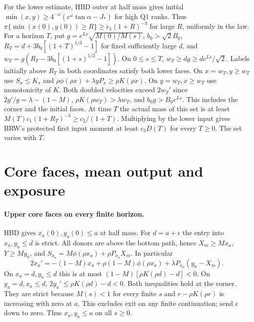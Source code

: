 \documentclass[11pt]{article}
\begin{document}
For the lower estimate, HBD outer at half mass gives initial
$\min(x,y)\ge4^{-\omega}(c^\omega\tan\alpha-J_*)$ for high Q1
ranks. Thus $\pi\{\min(x(0),y(0))\ge R\}\ge c_1(1+R)^{-3}$
for large $R$, uniformly in the law. For a horizon $T$, put
$g=e^{Ls}\sqrt{M(0)/M(s)}$, $b_0>\sqrt2 B_0$,
$R_T=d+3b_0[(1+T)^{1/3}-1]$ for fixed sufficiently large $d$,
and $w_T=g(R_T-3b_0[(1+s)^{1/3}-1])$. On $0\le s\le T$,
$w_T\ge dg\ge de^{Ls}/\sqrt2$. Labels initially above $R_T$
in both coordinates satisfy both lower faces. On $x=w_T,y\ge w_T$
use $S_x\le K_s$ and $\rho\phi(\rho x)+\lambda yP_x\ge\rho K(\rho x)$.
On $y=w_T,x\ge w_T$ use monotonicity of $K$.
Both doubled velocities exceed $2w_T'$ since
$2g'/g=\lambda-(1-M)$, $\rho K(\rho w_T)>\lambda w_T$, and
$b_0g>B_0e^{Ls}$. This includes the corner and the initial faces.
At time $T$ the actual mass of this set is at least
$M(T)c_1(1+R_T)^{-3}\ge c_2/(1+T)$. Multiplying by the lower
input gives BRW's protected first input moment at least
$c_3D(T)$ for every $T\ge0$. The set varies with $T$.

\section{Core faces, mean output and exposure}
\paragraph{Upper core faces on every finite horizon.}
HBD gives $x_a(0),y_a(0)\le a$ at half mass. For $d=a+\epsilon$
the entry into $x_a,y_a\le d$ is strict. All donors are above the
bottom path, hence $X_m\ge M x_a$, $Y\ge M y_a$, and
$S_{x_a}=M\phi(\rho x_a)+\rho P_{x_a}X_m$. In particular
\[
 2x_a'=-(1-M)x_a+\rho(1-M)\phi(\rho x_a)
                  +\lambda P_{x_a}(y_a-X_m).
\]
On $x_a=d,y_a\le d$ this is at most $(1-M)[\rho K(\rho d)-d]<0$.
On $y_a=d,x_a\le d$, $2y_a'\le\rho K(\rho d)-d<0$.
Both inequalities hold at the corner. They are strict because
$M(s)<1$ for every finite $s$ and $r-\rho K(\rho r)$ is increasing
with zero at $a$. This excludes exit on any finite continuation;
send $\epsilon$ down to zero. Thus $x_a,y_a\le a$ on all $s\ge0$.
\end{document}
